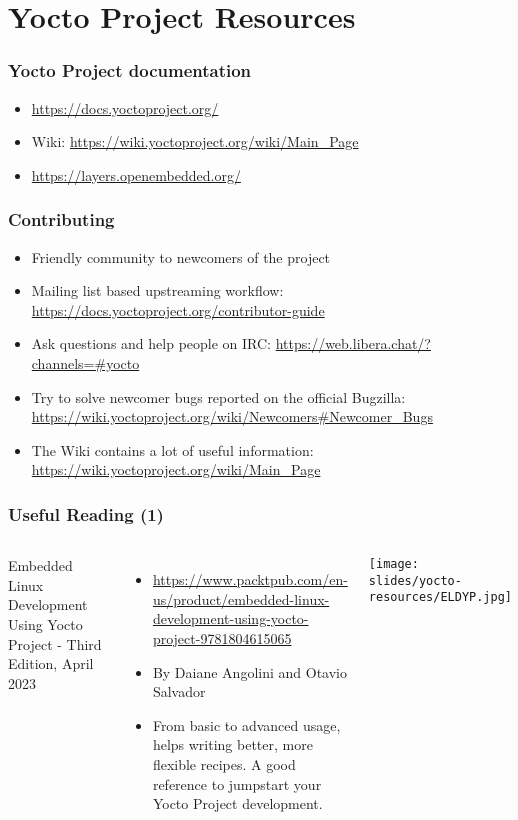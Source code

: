 \section{Yocto Project Resources}

\begin{frame}
  \frametitle{Yocto Project documentation}
  \begin{itemize}
  \item \url{https://docs.yoctoproject.org/}
  \item Wiki: \url{https://wiki.yoctoproject.org/wiki/Main_Page}
  \item \url{https://layers.openembedded.org/}
  \end{itemize}
\end{frame}

\begin{frame}
  \frametitle{Contributing}
  \begin{itemize}
    \item Friendly community to newcomers of the project
    \item Mailing list based upstreaming workflow:
      \url{https://docs.yoctoproject.org/contributor-guide}
    \item Ask questions and help people on IRC:
      \url{https://web.libera.chat/?channels=\#yocto}
    \item Try to solve newcomer bugs reported on the official Bugzilla:
      \url{https://wiki.yoctoproject.org/wiki/Newcomers\#Newcomer_Bugs}
    \item The Wiki contains a lot of useful information:
      \url{https://wiki.yoctoproject.org/wiki/Main_Page}
  \end{itemize}
\end{frame}

\begin{frame}
  \frametitle{Useful Reading (1)}
  \begin{columns}
    Embedded Linux Development Using Yocto Project - Third Edition, April 2023
    \begin{itemize}
    \item \url{https://www.packtpub.com/en-us/product/embedded-linux-development-using-yocto-project-9781804615065}
    \item By Daiane Angolini and Otavio Salvador
    \item From basic to advanced usage, helps writing better, more
      flexible recipes. A good reference to jumpstart your Yocto
      Project development.
    \end{itemize}
    \texttt{[image: slides/yocto-resources/ELDYP.jpg]}
  \end{columns}
\end{frame}

